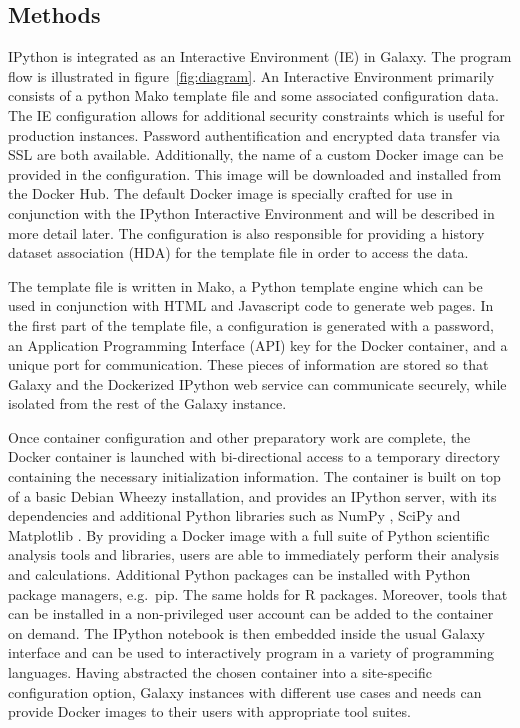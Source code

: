 \documentclass{bioinfo}
\begin{document}
\begin{methods}
\section{Methods}

IPython is integrated as an Interactive Environment (IE) in Galaxy. The program flow is illustrated in 
figure~\ref{fig:diagram}. An Interactive Environment primarily consists of a python Mako template file and some
associated configuration data. The IE configuration allows for additional security constraints which is useful
for production instances. Password authentification and encrypted data transfer via SSL are both available.
Additionally, the name of a custom Docker image can be provided in the configuration. This image will be downloaded and 
installed from the Docker Hub. The default Docker image is specially crafted for use in conjunction with the
IPython Interactive Environment and will be described in more detail later. 
The configuration is also responsible for providing a history dataset 
association (HDA) for the template file in order to access the data.

The template file is written in Mako, a Python template engine which can be used in conjunction with HTML
and Javascript code to generate web pages. In the first part of the template file, a configuration is generated with a password, 
an Application Programming Interface (API) key for the Docker container, and a unique port for communication. These pieces of information are stored so that Galaxy
and the Dockerized IPython web service can communicate securely, while isolated from the rest of the Galaxy instance.

Once container configuration and other preparatory work are complete, the Docker container is launched with bi-directional
access to a temporary directory containing the necessary initialization information. The container is built on top of a basic Debian Wheezy installation,
and provides an IPython server, with its dependencies and additional Python libraries such as NumPy \citep{Walt2011}, SciPy \citep{Jones2015} and Matplotlib \citep{Hunter2007}.
By providing a Docker image with a full suite of Python scientific analysis tools and libraries, users are able 
to immediately perform their analysis and calculations. Additional Python packages can be installed with Python
package managers, e.g.\ pip. The same holds for R packages. Moreover, tools that can be installed in a non-privileged user account can be added to the container on demand. 
The IPython notebook is then embedded inside the usual Galaxy interface and can be used to interactively program in a variety of programming languages.
Having abstracted the chosen container into a site-specific configuration option, Galaxy instances with different use cases
and needs can provide Docker images to their users with appropriate tool suites.


\end{methods}
\end{document}
